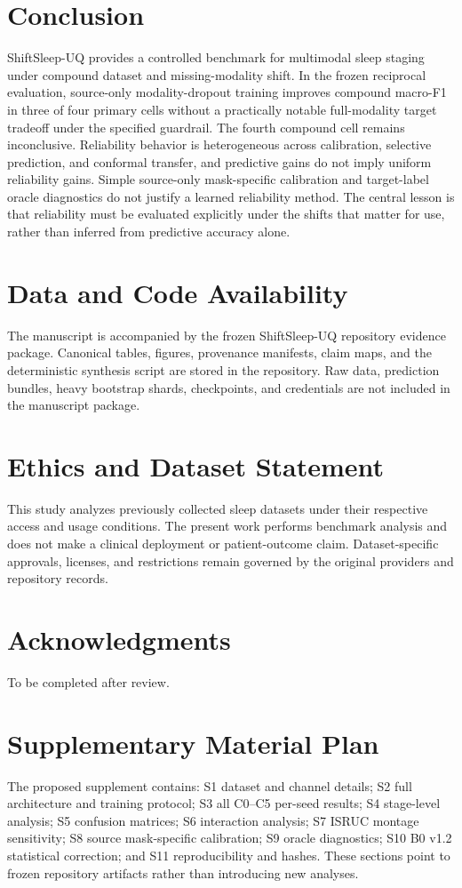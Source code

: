 \documentclass[11pt]{article}
\begin{document}
\section{Conclusion}
ShiftSleep-UQ provides a controlled benchmark for multimodal sleep staging under compound dataset and missing-modality shift. In the frozen reciprocal evaluation, source-only modality-dropout training improves compound macro-F1 in three of four primary cells without a practically notable full-modality target tradeoff under the specified guardrail. The fourth compound cell remains inconclusive. Reliability behavior is heterogeneous across calibration, selective prediction, and conformal transfer, and predictive gains do not imply uniform reliability gains. Simple source-only mask-specific calibration and target-label oracle diagnostics do not justify a learned reliability method. The central lesson is that reliability must be evaluated explicitly under the shifts that matter for use, rather than inferred from predictive accuracy alone.

\section{Data and Code Availability}
The manuscript is accompanied by the frozen ShiftSleep-UQ repository evidence package. Canonical tables, figures, provenance manifests, claim maps, and the deterministic synthesis script are stored in the repository. Raw data, prediction bundles, heavy bootstrap shards, checkpoints, and credentials are not included in the manuscript package.

\section{Ethics and Dataset Statement}
This study analyzes previously collected sleep datasets under their respective access and usage conditions. The present work performs benchmark analysis and does not make a clinical deployment or patient-outcome claim. Dataset-specific approvals, licenses, and restrictions remain governed by the original providers and repository records.

\section*{Acknowledgments}
To be completed after review.




\appendix
\section{Supplementary Material Plan}
The proposed supplement contains: S1 dataset and channel details; S2 full architecture and training protocol; S3 all C0--C5 per-seed results; S4 stage-level analysis; S5 confusion matrices; S6 interaction analysis; S7 ISRUC montage sensitivity; S8 source mask-specific calibration; S9 oracle diagnostics; S10 B0 v1.2 statistical correction; and S11 reproducibility and hashes. These sections point to frozen repository artifacts rather than introducing new analyses.
\end{document}
